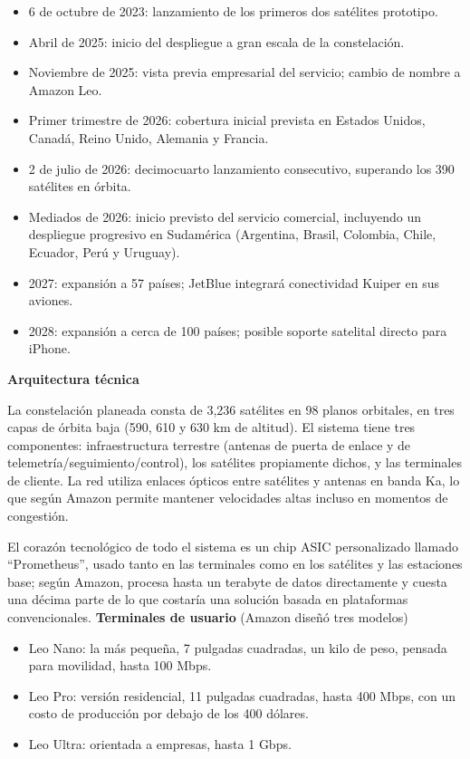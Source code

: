 \begin{itemize}
    \item{6 de octubre de 2023}: lanzamiento de los primeros dos satélites prototipo.
    \item{Abril de 2025}: inicio del despliegue a gran escala de la constelación.
    \item{Noviembre de 2025}: vista previa empresarial del servicio; cambio de nombre a Amazon Leo.
    \item{Primer trimestre de 2026}: cobertura inicial prevista en Estados Unidos, Canadá, Reino Unido, Alemania y Francia.
    \item{2 de julio de 2026}: decimocuarto lanzamiento consecutivo, superando los 390 satélites en órbita.
    \item{Mediados de 2026}: inicio previsto del servicio comercial, incluyendo un despliegue progresivo en Sudamérica (Argentina, Brasil, Colombia, Chile, Ecuador, Perú y Uruguay).
    \item{2027}: expansión a 57 países; JetBlue integrará conectividad Kuiper en sus aviones.
    \item{2028}: expansión a cerca de 100 países; posible soporte satelital directo para iPhone.
\end{itemize}

\noindent\textbf{Arquitectura técnica}

La constelación planeada consta de 3,236 satélites en 98 planos orbitales, en tres capas de órbita baja (590, 610 y 630 km de altitud). El sistema tiene tres componentes: infraestructura terrestre (antenas de puerta de enlace y de telemetría/seguimiento/control), los satélites propiamente dichos, y las terminales de cliente. La red utiliza enlaces ópticos entre satélites y antenas en banda Ka, lo que según Amazon permite mantener velocidades altas incluso en momentos de congestión.

El corazón tecnológico de todo el sistema es un chip ASIC personalizado llamado ``Prometheus'', usado tanto en las terminales como en los satélites y las estaciones base; según Amazon, procesa hasta un terabyte de datos directamente y cuesta una décima parte de lo que costaría una solución basada en plataformas convencionales.
\noindent\textbf{Terminales de usuario} (Amazon diseñó tres modelos)

\begin{itemize}
    \item{Leo Nano}: la más pequeña, 7 pulgadas cuadradas, un kilo de peso, pensada para movilidad, hasta 100 Mbps.
    \item{Leo Pro}: versión residencial, 11 pulgadas cuadradas, hasta 400 Mbps, con un costo de producción por debajo de los 400 dólares.
    \item{Leo Ultra}: orientada a empresas, hasta 1 Gbps.
\end{itemize}

